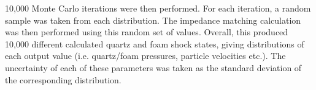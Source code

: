 

10,000 Monte Carlo iterations were then performed. For each iteration, a random sample was taken from each distribution. The impedance matching calculation was then performed using this random set of values. Overall, this produced 10,000 different calculated quartz and foam shock states, giving distributions of each output value (i.e. quartz/foam pressures, particle velocities etc.). The uncertainty of each of these parameters was taken as the standard deviation of the corresponding distribution.

